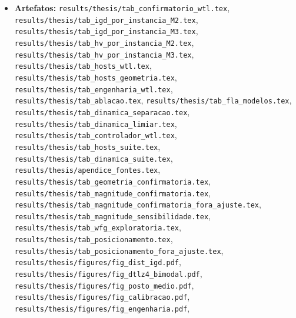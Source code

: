 \begin{itemize}[nosep]
    \item \textbf{Artefatos:} \texttt{results/\allowbreak{}thesis/\allowbreak{}tab\_\allowbreak{}confirmatorio\_\allowbreak{}wtl.tex}, \texttt{results/\allowbreak{}thesis/\allowbreak{}tab\_\allowbreak{}igd\_\allowbreak{}por\_\allowbreak{}instancia\_\allowbreak{}M2.tex}, \texttt{results/\allowbreak{}thesis/\allowbreak{}tab\_\allowbreak{}igd\_\allowbreak{}por\_\allowbreak{}instancia\_\allowbreak{}M3.tex}, \texttt{results/\allowbreak{}thesis/\allowbreak{}tab\_\allowbreak{}hv\_\allowbreak{}por\_\allowbreak{}instancia\_\allowbreak{}M2.tex}, \texttt{results/\allowbreak{}thesis/\allowbreak{}tab\_\allowbreak{}hv\_\allowbreak{}por\_\allowbreak{}instancia\_\allowbreak{}M3.tex}, \texttt{results/\allowbreak{}thesis/\allowbreak{}tab\_\allowbreak{}hosts\_\allowbreak{}wtl.tex}, \texttt{results/\allowbreak{}thesis/\allowbreak{}tab\_\allowbreak{}hosts\_\allowbreak{}geometria.tex}, \texttt{results/\allowbreak{}thesis/\allowbreak{}tab\_\allowbreak{}engenharia\_\allowbreak{}wtl.tex}, \texttt{results/\allowbreak{}thesis/\allowbreak{}tab\_\allowbreak{}ablacao.tex}, \texttt{results/\allowbreak{}thesis/\allowbreak{}tab\_\allowbreak{}fla\_\allowbreak{}modelos.tex}, \texttt{results/\allowbreak{}thesis/\allowbreak{}tab\_\allowbreak{}dinamica\_\allowbreak{}separacao.tex}, \texttt{results/\allowbreak{}thesis/\allowbreak{}tab\_\allowbreak{}dinamica\_\allowbreak{}limiar.tex}, \texttt{results/\allowbreak{}thesis/\allowbreak{}tab\_\allowbreak{}controlador\_\allowbreak{}wtl.tex}, \texttt{results/\allowbreak{}thesis/\allowbreak{}tab\_\allowbreak{}hosts\_\allowbreak{}suite.tex}, \texttt{results/\allowbreak{}thesis/\allowbreak{}tab\_\allowbreak{}dinamica\_\allowbreak{}suite.tex}, \texttt{results/\allowbreak{}thesis/\allowbreak{}apendice\_\allowbreak{}fontes.tex}, \texttt{results/\allowbreak{}thesis/\allowbreak{}tab\_\allowbreak{}geometria\_\allowbreak{}confirmatoria.tex}, \texttt{results/\allowbreak{}thesis/\allowbreak{}tab\_\allowbreak{}magnitude\_\allowbreak{}confirmatoria.tex}, \texttt{results/\allowbreak{}thesis/\allowbreak{}tab\_\allowbreak{}magnitude\_\allowbreak{}confirmatoria\_\allowbreak{}fora\_\allowbreak{}ajuste.tex}, \texttt{results/\allowbreak{}thesis/\allowbreak{}tab\_\allowbreak{}magnitude\_\allowbreak{}sensibilidade.tex}, \texttt{results/\allowbreak{}thesis/\allowbreak{}tab\_\allowbreak{}wfg\_\allowbreak{}exploratoria.tex}, \texttt{results/\allowbreak{}thesis/\allowbreak{}tab\_\allowbreak{}posicionamento.tex}, \texttt{results/\allowbreak{}thesis/\allowbreak{}tab\_\allowbreak{}posicionamento\_\allowbreak{}fora\_\allowbreak{}ajuste.tex}, \texttt{results/\allowbreak{}thesis/\allowbreak{}figures/\allowbreak{}fig\_\allowbreak{}dist\_\allowbreak{}igd.pdf}, \texttt{results/\allowbreak{}thesis/\allowbreak{}figures/\allowbreak{}fig\_\allowbreak{}dtlz4\_\allowbreak{}bimodal.pdf}, \texttt{results/\allowbreak{}thesis/\allowbreak{}figures/\allowbreak{}fig\_\allowbreak{}posto\_\allowbreak{}medio.pdf}, \texttt{results/\allowbreak{}thesis/\allowbreak{}figures/\allowbreak{}fig\_\allowbreak{}calibracao.pdf}, \texttt{results/\allowbreak{}thesis/\allowbreak{}figures/\allowbreak{}fig\_\allowbreak{}engenharia.pdf}, 
\end{itemize}
